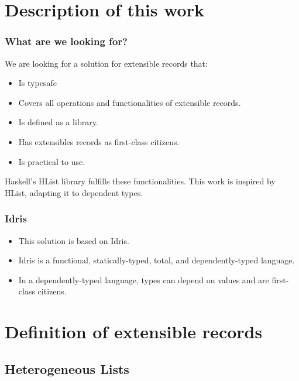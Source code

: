 \documentclass{beamer}
\begin{document}
\section{Description of this work}

\begin{frame}
\frametitle{What are we looking for?}

We are looking for a solution for extensible records that:

\begin{itemize}
\item Is typesafe
\item Covers all operations and functionalities of extensible records.
\item Is defined as a library.
\item Has extensibles records as first-class citizens.
\item Is practical to use.
\end{itemize}

\pause

Haskell's HList library fulfills these functionalities. This work is inspired by HList, adapting it to dependent types.

\end{frame}

\begin{frame}
\frametitle{Idris}

\begin{itemize}
\item This solution is based on Idris.
\item Idris is a functional, statically-typed, total, and dependently-typed language.
\item In a dependently-typed language, types can depend on values and are first-class citizens.
\end{itemize}
\end{frame}

\section{Definition of extensible records}

\subsection{Heterogeneous Lists}
\end{document}
